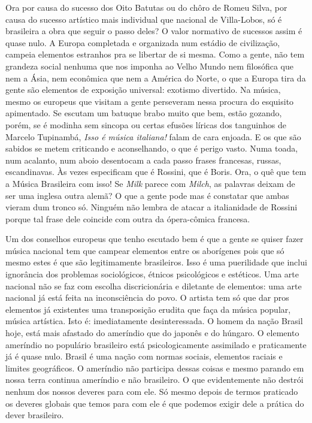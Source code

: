 Ora por causa do sucesso dos Oito Batutas ou do chôro de Romeu Silva,
por causa do sucesso artístico mais individual que nacional de
Villa-Lobos, só é brasileira a obra que seguir o passo deles? O valor
normativo de sucessos assim é quase nulo. A Europa completada e
organizada num estádio de civilização, campeia elementos estranhos pra
se libertar de si mesma. Como a gente, não tem grandeza social nenhuma
que nos imponha ao Velho Mundo nem filosófica que nem a Ásia, nem
econômica que nem a América do Norte, o que a Europa tira da gente são
elementos de exposição universal: exotismo divertido. Na música, mesmo
os europeus que visitam a gente perseveram nessa procura do esquisito
apimentado. Se escutam um batuque brabo muito que bem, estão gozando,
porém, se é modinha sem sincopa ou certas efusões líricas dos tanguinhos
de Marcelo Tupinambá, \emph{Isso é música italiana!} falam de cara
enjoada. E os que são sabidos se metem criticando e aconselhando, o que
é perigo vasto. Numa toada, num acalanto, num aboio desentocam a cada
passo frases francesas, russas, escandinavas. Às vezes especificam que é
Rossini, que é Boris. Ora, o quê que tem a Música Brasileira com isso!
Se \emph{Milk} parece com \emph{Milch}, as palavras deixam de ser uma
inglesa outra alemã? O que a gente pode mas é constatar que ambas vieram
dum tronco só. Ninguém não lembra de atacar a italianidade de Rossini
porque tal frase dele coincide com outra da ópera-cômica francesa.

Um dos conselhos europeus que tenho escutado bem é que a gente se quiser
fazer música nacional tem que campear elementos entre os aborígenes pois
que só mesmo estes é que são legitimamente brasileiros. Isso é uma
puerilidade que inclui ignorância dos problemas sociológicos, étnicos
psicológicos e estéticos. Uma arte nacional não se faz com escolha
discricionária e diletante de elementos: uma arte nacional já está feita
na inconsciência do povo. O artista tem só que dar pros elementos já
existentes uma transposição erudita que faça da música popular, música
artística. Isto é: imediatamente desinteressada. O homem da nação Brasil
hoje, está mais afastado do ameríndio que do japonês e do húngaro. O
elemento ameríndio no populário brasileiro está psicologicamente
assimilado e praticamente já é quase nulo. Brasil é uma nação com normas
sociais, elementos raciais e limites geográficos. O ameríndio não
participa dessas coisas e mesmo parando em nossa terra continua
ameríndio e não brasileiro. O que evidentemente não destrói nenhum dos
nossos deveres para com ele. Só mesmo depois de termos praticado os
deveres globais que temos para com ele é que podemos exigir dele a
prática do dever brasileiro.

